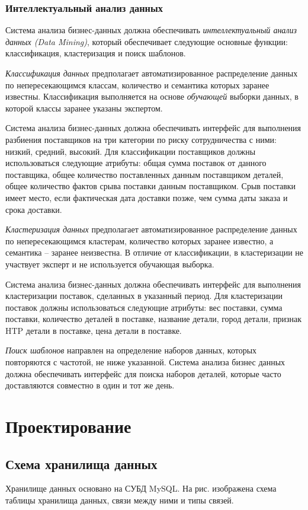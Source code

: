 \subsubsection{Интеллектуальный анализ данных}
Система анализа бизнес-данных должна обеспечивать \textit{интеллектуальный анализ данных (Data Mining)}, который обеспечивает следующие основные функции: классификация, кластеризация и поиск шаблонов.\par
\textit{Классификация данных} предполагает автоматизированное распределение данных по непересекающимся классам, количество и семантика которых заранее известны. Классификация выполняется на основе \textit{обучающей} выборки данных, в которой классы заранее указаны экспертом.\par
Система анализа бизнес-данных должна обеспечивать интерфейс для выполнения разбиения поставщиков на три категории по риску сотрудничества с ними: низкий, средний, высокий. Для классификации поставщиков должны использоваться следующие атрибуты: общая сумма поставок от данного поставщика, общее количество поставленных данным поставщиком деталей, общее количество фактов срыва поставки данным поставщиком. Срыв поставки имеет место, если фактическая дата доставки позже, чем сумма даты заказа и срока доставки.\par
\textit{Кластеризация данных} предполагает автоматизированное распределение данных по непересекающимся кластерам, количество которых заранее известно, а семантика – заранее неизвестна. В отличие от классификации, в кластеризации не участвует эксперт и не используется обучающая выборка.\par
Система анализа бизнес-данных должна обеспечивать интерфейс для выполнения кластеризации поставок, сделанных в указанный период. Для кластеризации поставок должны использоваться следующие атрибуты: вес поставки, сумма поставки, количество деталей в поставке, название детали, город детали, признак HTP детали в поставке, цена детали в поставке. \par
\textit{Поиск шаблонов} направлен на определение наборов данных, которых повторяются с частотой, не ниже указанной. Система анализа бизнес данных должна обеспечивать интерфейс для поиска наборов деталей, которые часто доставляются совместно в один и тот же день.

\section{Проектирование}
\subsection{Схема хранилища данных}
Хранилище данных основано на СУБД MySQL. На рис.  изображена схема таблицы хранилища данных, связи между ними и типы связей.

